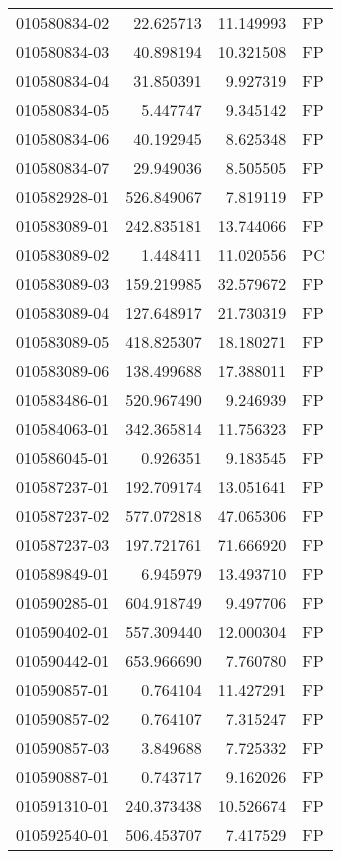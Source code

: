 \begin{tabular}{lrrl}
010580834-02 &   22.625713 &    11.149993 &   FP \\
010580834-03 &   40.898194 &    10.321508 &   FP \\
010580834-04 &   31.850391 &     9.927319 &   FP \\
010580834-05 &    5.447747 &     9.345142 &   FP \\
010580834-06 &   40.192945 &     8.625348 &   FP \\
010580834-07 &   29.949036 &     8.505505 &   FP \\
010582928-01 &  526.849067 &     7.819119 &   FP \\
010583089-01 &  242.835181 &    13.744066 &   FP \\
010583089-02 &    1.448411 &    11.020556 &   PC \\
010583089-03 &  159.219985 &    32.579672 &   FP \\
010583089-04 &  127.648917 &    21.730319 &   FP \\
010583089-05 &  418.825307 &    18.180271 &   FP \\
010583089-06 &  138.499688 &    17.388011 &   FP \\
010583486-01 &  520.967490 &     9.246939 &   FP \\
010584063-01 &  342.365814 &    11.756323 &   FP \\
010586045-01 &    0.926351 &     9.183545 &   FP \\
010587237-01 &  192.709174 &    13.051641 &   FP \\
010587237-02 &  577.072818 &    47.065306 &   FP \\
010587237-03 &  197.721761 &    71.666920 &   FP \\
010589849-01 &    6.945979 &    13.493710 &   FP \\
010590285-01 &  604.918749 &     9.497706 &   FP \\
010590402-01 &  557.309440 &    12.000304 &   FP \\
010590442-01 &  653.966690 &     7.760780 &   FP \\
010590857-01 &    0.764104 &    11.427291 &   FP \\
010590857-02 &    0.764107 &     7.315247 &   FP \\
010590857-03 &    3.849688 &     7.725332 &   FP \\
010590887-01 &    0.743717 &     9.162026 &   FP \\
010591310-01 &  240.373438 &    10.526674 &   FP \\
010592540-01 &  506.453707 &     7.417529 &   FP \\

\end{tabular}
